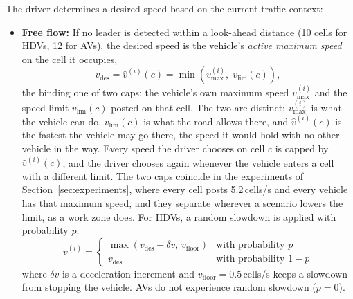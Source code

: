 \documentclass[review,number]{elsarticle}
\begin{document}
The driver determines a desired speed based on the current traffic context:

\begin{itemize}
    \item \textbf{Free flow:} If no leader is detected within a look-ahead distance (10 cells for HDVs, 12 for AVs), the desired speed is the vehicle's \emph{active maximum speed} on the cell it occupies,
    \begin{equation}
        v_{\text{des}} = \hat{v}^{(i)}(c) = \min\!\left(v_{\max}^{(i)},\; v_{\text{lim}}(c)\right),
        \label{eq:free_flow_speed}
    \end{equation}
    the binding one of two caps: the vehicle's own maximum speed $v_{\max}^{(i)}$ and the speed limit $v_{\text{lim}}(c)$ posted on that cell. The two are distinct: $v_{\max}^{(i)}$ is what the vehicle can do, $v_{\text{lim}}(c)$ is what the road allows there, and $\hat{v}^{(i)}(c)$ is the fastest the vehicle may go there, the speed it would hold with no other vehicle in the way. Every speed the driver chooses on cell $c$ is capped by $\hat{v}^{(i)}(c)$, and the driver chooses again whenever the vehicle enters a cell with a different limit. The two caps coincide in the experiments of Section~\ref{sec:experiments}, where every cell posts 5.2\,cells/s and every vehicle has that maximum speed, and they separate wherever a scenario lowers the limit, as a work zone does. For HDVs, a random slowdown is applied with probability $p$:
    \begin{equation}
        v^{(i)} = \begin{cases}
            \max(v_{\text{des}} - \delta v,\, v_{\text{floor}}) & \text{with probability } p \\
            v_{\text{des}} & \text{with probability } 1 - p
        \end{cases}
        \label{eq:free_flow}
    \end{equation}
    where $\delta v$ is a deceleration increment and $v_{\text{floor}} = 0.5$\,cells/s keeps a slowdown from stopping the vehicle. AVs do not experience random slowdown ($p = 0$).


\end{itemize}
\end{document}

